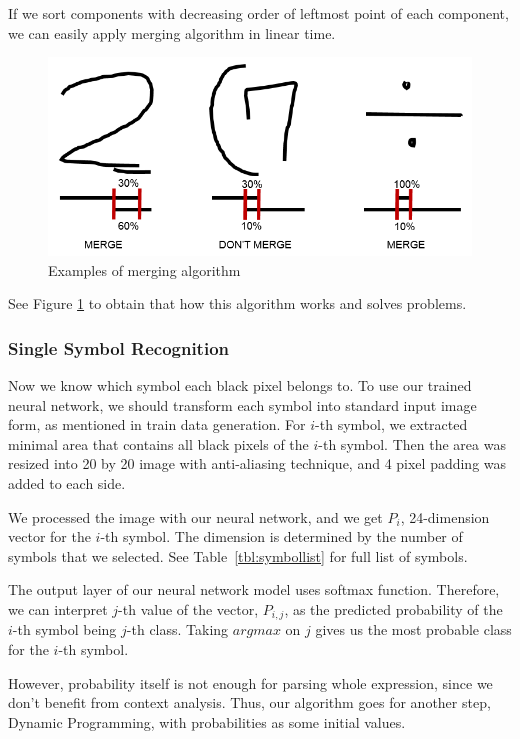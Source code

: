 \documentclass[10pt,twocolumn,letterpaper]{article}
\begin{document}
If we sort components with decreasing order of leftmost point of each component,
we can easily apply merging algorithm in linear time.

\begin{figure}[t]
    \begin{center}
        \includegraphics[width=0.8\linewidth]{img/merging.png}
    \end{center}
    \caption{Examples of merging algorithm}
    \label{fig:merging}
\end{figure}

See Figure \ref{fig:merging} to obtain that how this algorithm works and solves problems.

\subsubsection{Single Symbol Recognition}

Now we know which symbol each black pixel belongs to.
To use our trained neural network, we should transform each symbol into standard input image form, as mentioned in train data generation.
For $i$-th symbol, we extracted minimal area that contains all black pixels of the $i$-th symbol.
Then the area was resized into 20 by 20 image with anti-aliasing technique, and 4 pixel padding was added to each side.

We processed the image with our neural network, and we get $P_i$, 24-dimension vector for the $i$-th symbol.
The dimension is determined by the number of symbols that we selected.
See Table~\ref{tbl:symbollist} for full list of symbols.

The output layer of our neural network model uses softmax function.
Therefore, we can interpret $j$-th value of the vector, $P_{i,j}$, as the predicted probability of the $i$-th symbol being $j$-th class.
Taking $argmax$ on $j$ gives us the most probable class for the $i$-th symbol.

However, probability itself is not enough for parsing whole expression, since we don't benefit from context analysis.
Thus, our algorithm goes for another step, Dynamic Programming, with probabilities as some initial values.
\end{document}
